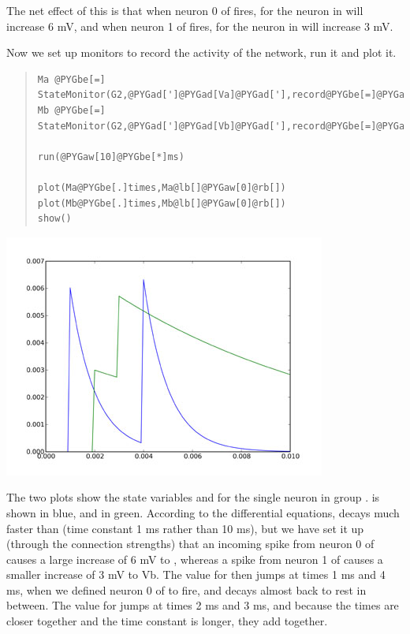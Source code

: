 \documentclass[letterpaper,10pt,english]{manual}
\begin{document}
The net effect of this is that when neuron 0 of  fires,  for
the neuron in  will increase 6 mV, and when neuron 1 of  fires,
 for the neuron in  will increase 3 mV.

Now we set up monitors to record the activity of the network,
run it and plot it.
\begin{quote}

\begin{Verbatim}[commandchars=@\[\]]
Ma @PYGbe[=] StateMonitor(G2,@PYGad[']@PYGad[Va]@PYGad['],record@PYGbe[=]@PYGaA[True])
Mb @PYGbe[=] StateMonitor(G2,@PYGad[']@PYGad[Vb]@PYGad['],record@PYGbe[=]@PYGaA[True])

run(@PYGaw[10]@PYGbe[*]ms)

plot(Ma@PYGbe[.]times,Ma@lb[]@PYGaw[0]@rb[])
plot(Mb@PYGbe[.]times,Mb@lb[]@PYGaw[0]@rb[])
show()
\end{Verbatim}
\end{quote}

\includegraphics{2a.jpg}

The two plots show the state variables  and  for the single
neuron in group .  is shown in blue, and  in green.
According to the differential equations,  decays much faster
than  (time constant 1 ms rather than 10 ms), but we have set
it up (through the connection strengths) that an incoming
spike from neuron 0 of  causes a large increase of 6 mV to ,
whereas a spike from neuron 1 of  causes a smaller increase of
3 mV to Vb. The value for  then jumps at times 1 ms and 4 ms,
when we defined neuron 0 of  to fire, and decays almost back
to rest in between. The value for  jumps at times 2 ms and
3 ms, and because the times are closer together and the time
constant is longer, they add together.
\end{document}

